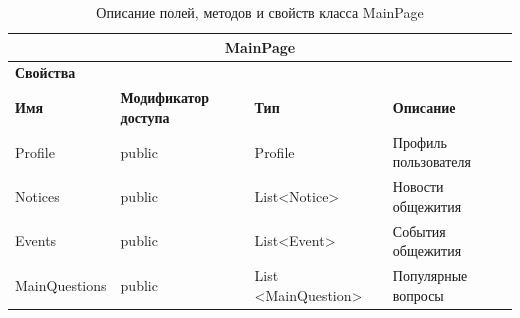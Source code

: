 \documentclass{../includes/TechDoc}
\begin{document}
    \begin{table}[ht]
        \caption{\label{tab:class-mainpagemodel-table}Описание полей, методов и свойств класса MainPage}
        \centering
        \begin{tabular}{|p{3.2cm}|p{3cm}|p{2.9cm}|p{2.9cm}|p{4cm}|}
            \hline
            \multicolumn{5}{|c|}{MainPage} \\ \hline
            \multicolumn{5}{|l|}{\textbf{Свойства}} \\ \hline
            \textbf{Имя} & \textbf{Модификатор доступа} & \textbf{Тип} & \multicolumn{2}{p{6.9cm}|}{\textbf{Описание}} \\ \hline
            Profile & public & Profile & \multicolumn{2}{p{6.9cm}|}{Профиль пользователя} \\ \hline
            Notices & public & List<Notice> & \multicolumn{2}{p{6.9cm}|}{Новости общежития} \\ \hline
            Events & public & List<Event> & \multicolumn{2}{p{6.9cm}|}{События общежития} \\ \hline
            MainQuestions & public & List <MainQuestion> & \multicolumn{2}{p{6.9cm}|}{Популярные вопросы} \\ \hline
        \end{tabular}
    \end{table}

    \registrationList
\end{document}
